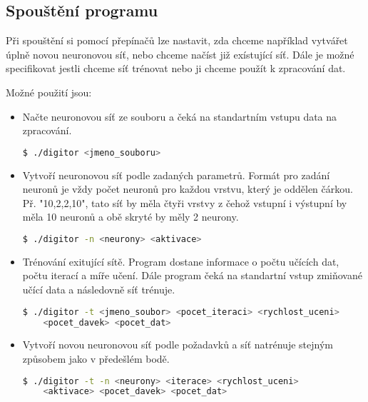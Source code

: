 \subsection{Spouštění programu}
Při spouštění si pomocí přepínačů lze nastavit, zda chceme například vytvářet úplně novou neuronovou síť, nebo chceme načíst již exístující síť. Dále je možné specifikovat jestli chceme síť trénovat nebo ji chceme použít k zpracování dat.

Možné použití jsou:
\begin{itemize}
    \item Načte neuronovou síť ze souboru a čeká na standartním vstupu data na zpracování.
    \begin{lstlisting}[language=bash, backgroundcolor=\color{backcolor}]
 $ ./digitor <jmeno_souboru>
    \end{lstlisting}

    \item Vytvoří neuronovou síť podle zadaných parametrů.
    Formát pro zadání neuronů je vždy počet neuronů pro každou vrstvu, který je oddělen čárkou.
    Př. "10,2,2,10", tato síť by měla čtyři vrstvy z čehož vstupní i výstupní by měla 10 neuronů a obě skryté by měly 2 neurony.
    \begin{lstlisting}[language=bash, backgroundcolor=\color{backcolor}]
 $ ./digitor -n <neurony> <aktivace>
    \end{lstlisting}

    \item Trénování exitující sítě. Program dostane informace o počtu učících dat, počtu iterací a míře učení.
    Dále program čeká na standartní vstup zmiňované učící data a následovně síť trénuje.
    \begin{lstlisting}[language=bash, backgroundcolor=\color{backcolor}]
 $ ./digitor -t <jmeno_soubor> <pocet_iteraci> <rychlost_uceni>
    <pocet_davek> <pocet_dat>
    \end{lstlisting}

    \item Vytvoří novou neuronovou síť podle požadavků a síť natrénuje stejným způsobem jako v předešlém bodě.
    \begin{lstlisting}[language=bash, backgroundcolor=\color{backcolor}]
 $ ./digitor -t -n <neurony> <iterace> <rychlost_uceni>
    <aktivace> <pocet_davek> <pocet_dat>
    \end{lstlisting}
\end{itemize}
